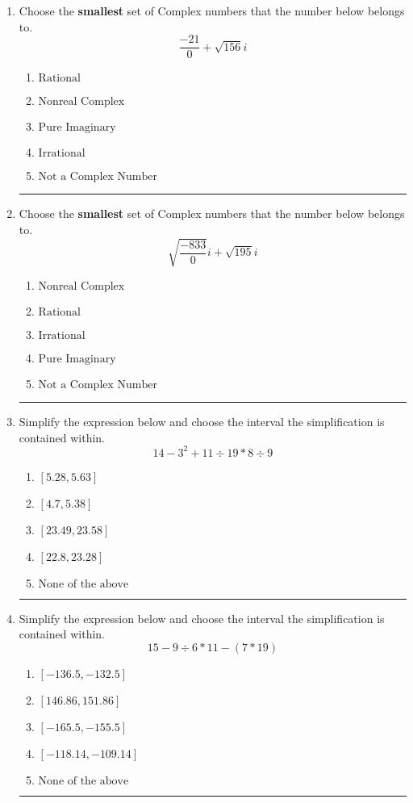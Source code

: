 \documentclass[14pt]{extbook}
\newcommand{\litem}[1]{\item#1\hspace*{-1cm}\rule{\textwidth}{0.4pt}}
\begin{document}
\begin{enumerate}
\litem{
Choose the \textbf{smallest} set of Complex numbers that the number below belongs to.\[ \frac{-21}{0}+\sqrt{156} i \]\begin{enumerate}[label=\Alph*.]
\item \( \text{Rational} \)
\item \( \text{Nonreal Complex} \)
\item \( \text{Pure Imaginary} \)
\item \( \text{Irrational} \)
\item \( \text{Not a Complex Number} \)

\end{enumerate} }
\litem{
Choose the \textbf{smallest} set of Complex numbers that the number below belongs to.\[ \sqrt{\frac{-833}{0}} i+\sqrt{195}i \]\begin{enumerate}[label=\Alph*.]
\item \( \text{Nonreal Complex} \)
\item \( \text{Rational} \)
\item \( \text{Irrational} \)
\item \( \text{Pure Imaginary} \)
\item \( \text{Not a Complex Number} \)

\end{enumerate} }
\litem{
Simplify the expression below and choose the interval the simplification is contained within.\[ 14 - 3^2 + 11 \div 19 * 8 \div 9 \]\begin{enumerate}[label=\Alph*.]
\item \( [5.28, 5.63] \)
\item \( [4.7, 5.38] \)
\item \( [23.49, 23.58] \)
\item \( [22.8, 23.28] \)
\item \( \text{None of the above} \)

\end{enumerate} }
\litem{
Simplify the expression below and choose the interval the simplification is contained within.\[ 15 - 9 \div 6 * 11 - (7 * 19) \]\begin{enumerate}[label=\Alph*.]
\item \( [-136.5, -132.5] \)
\item \( [146.86, 151.86] \)
\item \( [-165.5, -155.5] \)
\item \( [-118.14, -109.14] \)
\item \( \text{None of the above} \)


\end{enumerate}}
\end{enumerate}
\end{document}
